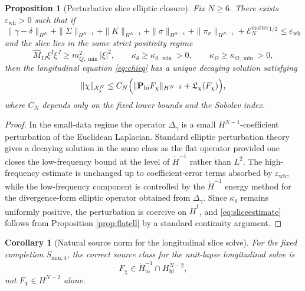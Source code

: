 \documentclass[11pt]{article}
\newtheorem{proposition}{Proposition}
\newtheorem{corollary}{Corollary}
\begin{document}
\begin{proposition}[Perturbative slice elliptic closure]
\label{prop:sliceell}
Fix \(N\ge 6\). There exists \(\varepsilon_{\mathrm{wh}}>0\) such that if
\begin{equation}
\|\gamma-\delta\|_{H^N}
+ \|\Sigma\|_{H^{N-1}}
+ \|K\|_{H^{N-1}}
+ \|\sigma\|_{H^{N-1}}
+ \|\pi_\sigma\|_{H^{N-1}}
+ \mathcal E_N^{\mathrm{matter}}{}^{1/2}
\le
\varepsilon_{\mathrm{wh}}
\label{eq:whsmall}
\end{equation}
and the slice lies in the same strict positivity regime
\begin{equation}
\widehat M_{IJ}\xi^I\xi^J\ge m_{Q,\min}^2|\xi|^2,
\qquad
\kappa_\theta\ge \kappa_{\theta,\min}>0,
\qquad
\kappa_\Omega\ge \kappa_{\Omega,\min}>0,
\label{eq:strict}
\end{equation}
then the longitudinal equation \eqref{eq:chieq} has a unique decaying solution satisfying
\begin{equation}
\|\chi\|_{\mathcal X_\chi^N}
\le
C_N
\Bigl(
\|\mathbf P_{\mathrm{hi}}F_\chi\|_{H^{N-2}}
+ \mathfrak L_\chi(F_\chi)
\Bigr),
\label{eq:sliceestimate}
\end{equation}
where \(C_N\) depends only on the fixed lower bounds and the Sobolev index.
\end{proposition}

\begin{proof}
In the small-data regime the operator \(\Delta_\gamma\) is a small \(H^{N-1}\)-coefficient perturbation of the Euclidean Laplacian. Standard elliptic perturbation theory gives a decaying solution in the same class as the flat operator provided one closes the low-frequency bound at the level of \(\dot H^{-1}\) rather than \(L^2\). The high-frequency estimate is unchanged up to coefficient-error terms absorbed by \(\varepsilon_{\mathrm{wh}}\), while the low-frequency component is controlled by the \(\dot H^{-1}\) energy method for the divergence-form elliptic operator obtained from \(\Delta_\gamma\). Since \(\kappa_\theta\) remains uniformly positive, the perturbation is coercive on \(\dot H^1\), and \eqref{eq:sliceestimate} follows from Proposition \ref{prop:flatell} by a standard continuity argument.
\end{proof}

\begin{corollary}[Natural source norm for the longitudinal slice solve]
\label{cor:source}
For the fixed completion \(S_{\mathrm{min},4}\), the correct source class for the unit-lapse longitudinal solve is
\begin{equation}
F_\chi \in \dot H^{-1}_{\mathrm{lo}} \cap H^{N-2}_{\mathrm{hi}},
\label{eq:sourceclass}
\end{equation}
not \(F_\chi\in H^{N-2}\) alone.
\end{corollary}
\end{document}
